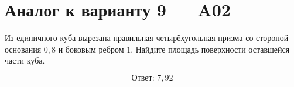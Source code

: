 \documentclass[12pt,a4paper]{article}
\begin{document}
\section*{Аналог к варианту 9 — A02}

Из единичного куба вырезана правильная четырёхугольная призма со стороной основания \(0{,}8\) и боковым ребром \(1\). Найдите площадь поверхности оставшейся части куба.

\begin{center}
\end{center}

\[
\boxed{\text{Ответ: }7{,}92}
\]
\end{document}
